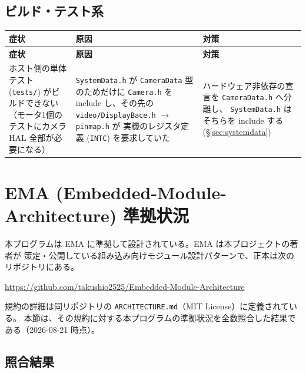 \documentclass[a4paper,11pt,dvipdfmx]{jsarticle}
\begin{document}
\subsection{ビルド・テスト系}

\begin{longtable}{p{40mm} p{55mm} p{55mm}}
\toprule
\textbf{症状} & \textbf{原因} & \textbf{対策} \\
\midrule
\endfirsthead
\toprule
\textbf{症状} & \textbf{原因} & \textbf{対策} \\
\midrule
\endhead
ホスト側の単体テスト (\texttt{tests/}) がビルドできない
（モータ1個のテストにカメラ HAL 全部が必要になる） &
  \texttt{SystemData.h} が \texttt{CameraData} 型のためだけに \texttt{Camera.h} を
  include し、その先の \texttt{video/DisplayBace.h} $\rightarrow$ \texttt{pinmap.h} が
  実機のレジスタ定義 (\texttt{INTC}) を要求していた &
  ハードウェア非依存の宣言を \texttt{CameraData.h} へ分離し、
  \texttt{SystemData.h} はそちらを include する
  (\hyperref[sec:systemdata]{§\ref*{sec:systemdata}}) \\
\bottomrule
\end{longtable}


\section{EMA (Embedded-Module-Architecture) 準拠状況}\label{sec:emacompliance}

本プログラムは EMA に準拠して設計されている。EMA は本プロジェクトの著者が
策定・公開している組み込み向けモジュール設計パターンで、正本は次のリポジトリにある。

\begin{center}
\url{https://github.com/takushio2525/Embedded-Module-Architecture}
\end{center}

規約の詳細は同リポジトリの \texttt{ARCHITECTURE.md}（MIT License）に定義されている。
本節は、その規約に対する本プログラムの準拠状況を全数照合した結果である（2026-08-21 時点）。

\subsection{照合結果}
\end{document}
